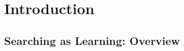 \documentclass[a4paper, nobind]{templates/ociamthesis}
\begin{document}
\begin{romanpages}
\dominitoc %

\flushbottom

\tableofcontents

\listoffigures
	\mtcaddchapter

\listoftables
  \mtcaddchapter

\end{romanpages}

\flushbottom

\hypertarget{introduction}{%
\chapter{Introduction}\label{introduction}}

\hypertarget{sec_intro_overview}{%
\section{Searching as Learning: Overview}\label{sec_intro_overview}}
\end{document}
